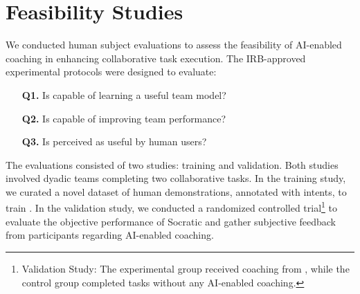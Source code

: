 \section{Feasibility Studies}
We conducted human subject evaluations to assess the feasibility of AI-enabled coaching in enhancing collaborative task execution. The IRB-approved experimental protocols were designed to evaluate:
\begin{itemize}
    \item[\textbf{Q1.}] Is \coach capable of learning a useful team model?
    \item[\textbf{Q2.}] Is \coach capable of improving team performance?
    \item[\textbf{Q3.}] Is \coach perceived as useful by human users?
\end{itemize}

The evaluations consisted of two studies: training and validation. Both studies involved dyadic teams completing two collaborative tasks. In the training study, we curated a novel dataset of human demonstrations, annotated with intents, to train \coach. In the validation study, we conducted a randomized controlled trial\footnote{Validation Study: The experimental group received coaching from \coach, while the control group completed tasks without any AI-enabled coaching.} to evaluate the objective performance of Socratic and gather subjective feedback from participants regarding AI-enabled coaching. 





